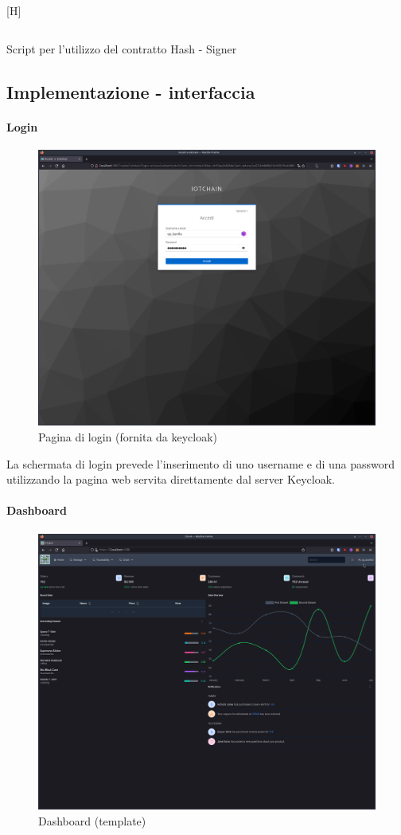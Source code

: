 \documentclass[a4paper,11pt]{article}
\newenvironment{longlisting}{\captionsetup{type=figure,labelformat=custom}}{}
\begin{document}
\begin{longlisting}[H]
  \inputminted{typescript}{./code/hash.sign.ts}
  \caption{Script per l'utilizzo del contratto Hash - Signer}
  \label{listing:hash6}
\end{longlisting}


\subsection{Implementazione - interfaccia}

\paragraph{Login}
\begin{figure}[H]
  \centering
  \includegraphics[width=0.5\linewidth]{screenIotChain/0001.png}
  \caption{Pagina di login (fornita da keycloak)}
  \label{fig:screen1_login}
\end{figure}

La schermata di login prevede l'inserimento di uno username e di una password utilizzando la pagina web servita direttamente dal server Keycloak.


\paragraph{Dashboard}

\begin{figure}[H]
  \centering
  \includegraphics[width=0.50\linewidth]{screenIotChain/0002.png}
  \caption{Dashboard (template)}
  \label{fig:screen2}
\end{figure}
\end{document}
